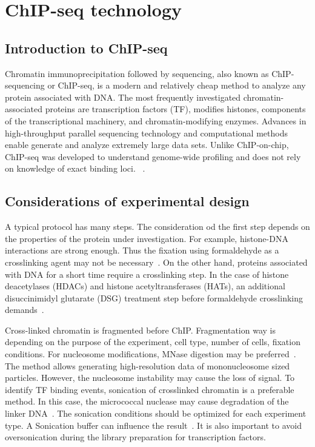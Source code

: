 \chapter{ChIP-seq technology}

\section{Introduction to ChIP-seq}
Chromatin immunoprecipitation followed by sequencing, also known as ChIP-sequencing or ChIP-seq, is a modern and relatively cheap method to analyze any protein associated with DNA. 
The most frequently investigated chromatin-associated proteins are transcription factors (TF), modifies histones, components of the transcriptional machinery, and chromatin-modifying enzymes.
Advances in high-throughput parallel sequencing technology and computational methods enable generate and analyze extremely large data sets. 
Unlike ChIP-on-chip, ChIP-seq was developed to understand genome-wide profiling and does not rely on knowledge of exact binding loci.~\cite{park2009chip} .


\section{Considerations of experimental design}

A typical protocol has many steps. 
The consideration od the first step depends on the properties of the protein under investigation. 
For example, histone-DNA interactions are strong enough. 
Thus the fixation using formaldehyde as a crosslinking agent may not be necessary~\cite{barski2008identification}. 
On the other hand, proteins associated with DNA for a short time require a crosslinking step. 
In the case of histone deacetylases (HDACs) and histone acetyltransferases (HATs), an additional disuccinimidyl glutarate (DSG) treatment step before formaldehyde crosslinking demands~\cite{wang2009genome}. 

Cross-linked chromatin is fragmented before ChIP. 
Fragmentation way is depending on the purpose of the experiment, cell type, number of cells, fixation conditions. 
For nucleosome modifications, MNase digestion may be preferred~\cite{kidder2011chip}.  
The method allows generating high-resolution data of mononucleosome sized particles. 
However, the nucleosome instability may cause the loss of signal.
To identify TF binding events, sonication of crosslinked chromatin is a preferable method. 
In this case, the micrococcal nuclease may cause degradation of the linker DNA~\cite{kidder2011chip}.
The sonication conditions should be optimized for each experiment type. 
A Sonication buffer can influence the result~\cite{steger2008dot1l}. 
It is also important to avoid oversonication during the library preparation for transcription factors. 


